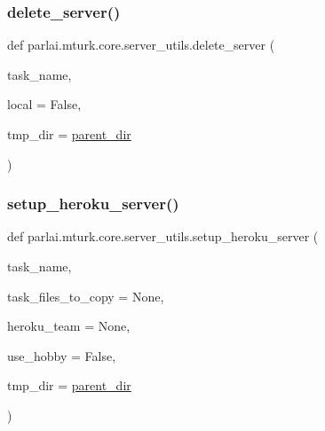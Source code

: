\mbox{\label{namespaceparlai_1_1mturk_1_1core_1_1server__utils_a3c7c1d82bd4d26eb98ce9711de3cca7c}} 
\subsubsection{\texorpdfstring{delete\+\_\+server()}{delete\_server()}}
{\footnotesize\ttfamily def parlai.\+mturk.\+core.\+server\+\_\+utils.\+delete\+\_\+server (\begin{DoxyParamCaption}\item[{}]{task\+\_\+name,  }\item[{}]{local = {\ttfamily False},  }\item[{}]{tmp\+\_\+dir = {\ttfamily \hyperlink{namespaceparlai_1_1mturk_1_1core_1_1server__utils_a193439bdbc25a32b00f1a43e6f8532d8}{parent\+\_\+dir}} }\end{DoxyParamCaption})}

\mbox{\label{namespaceparlai_1_1mturk_1_1core_1_1server__utils_af1c97e9b93a403e200ac75b87a51c3c1}} 
\subsubsection{\texorpdfstring{setup\+\_\+heroku\+\_\+server()}{setup\_heroku\_server()}}
{\footnotesize\ttfamily def parlai.\+mturk.\+core.\+server\+\_\+utils.\+setup\+\_\+heroku\+\_\+server (\begin{DoxyParamCaption}\item[{}]{task\+\_\+name,  }\item[{}]{task\+\_\+files\+\_\+to\+\_\+copy = {\ttfamily None},  }\item[{}]{heroku\+\_\+team = {\ttfamily None},  }\item[{}]{use\+\_\+hobby = {\ttfamily False},  }\item[{}]{tmp\+\_\+dir = {\ttfamily \hyperlink{namespaceparlai_1_1mturk_1_1core_1_1server__utils_a193439bdbc25a32b00f1a43e6f8532d8}{parent\+\_\+dir}} }\end{DoxyParamCaption})}

